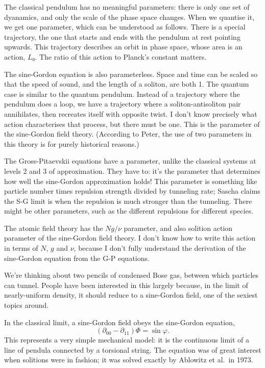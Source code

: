 The classical pendulum has no meaningful parameters: there is only one set of dyanamics, and only the scale of the phase space changes.  When we quantise it, we get one parameter, which can be understood as follows.  There is a special trajectory, the one that starts and ends with the pendulum at rest pointing upwards.  This trajectory describes an orbit in phase space, whose area is an action, $L₀$.  The ratio of this action to Planck's constant matters.

The sine-Gordon equation is also parameterless.  Space and time can be scaled so that the speed of sound, and the length of a soliton, are both 1.  The quantum case is similar to the quantum pendulum.  Instead of a trajectory where the pendulum does a loop, we have a trajectory where a soliton-antisoliton pair annihilates, then recreates itself with opposite twist.  I don't know precisely what action characterises that process, but there must be one.  This is the parameter of the sine-Gordon field theory.  (According to Peter, the use of two parameters in this theory is for purely historical reasons.)

The Gross-Pitaevskii equations have a parameter, unlike the classical systems at levels 2 and 3 of approximation.  They have to: it's the parameter that determines how well the sine-Gordon approximation holds!  This parameter is something like particle number times repulsion strength divided by tunneling rate; Sascha claims the S-G limit is when the repulsion is much stronger than the tunneling.  There might be other parameters, such as the different repulsions for different species.

The atomic field theory has the $Ng/ν$ parameter, and also solition action parameter of the sine-Gordon field theory.  I don't know how to write this action in terms of $N$, $g$ and $ν$, because I don't fully understand the derivation of the sine-Gordon equation from the G-P equations.



We're thinking about two pencils of condensed Bose gas, between which particles can tunnel.  People have been interested in this largely because, in the limit of nearly-uniform density, it should reduce to a sine-Gordon field, one of the sexiest topics around.

In the classical limit, a sine-Gordon field obeys the sine-Gordon equation, $$(∂_{00}-∂_{11})Φ=\sin φ.$$  This represents a very simple mechanical model: it is the continuous limit of a line of pendula connected by a torsional string.  The equation was of great interest when solitions were in fashion; it was solved exactly by Ablowitz et al.\ in 1973.

